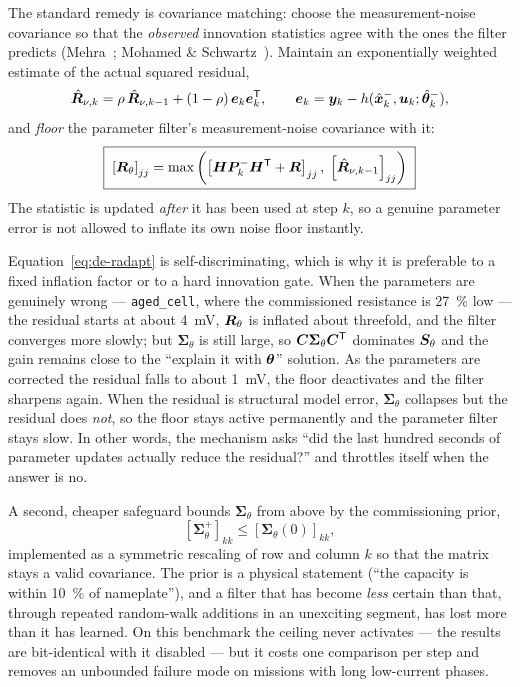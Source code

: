 The standard remedy is covariance matching: choose the measurement-noise covariance so that the
\emph{observed} innovation statistics agree with the ones the filter predicts (Mehra~\cite{mehra1970};
Mohamed \& Schwartz~\cite{mohamed1999adaptive}).  Maintain an exponentially weighted estimate of the
actual squared residual,
\begin{equation}
\hat{\bm{R}}_{\nu,k}=\rho\,\hat{\bm{R}}_{\nu,k-1}+(1-\rho)\,\bm{e}_k\bm{e}_k^{\mathsf{T}},
\qquad \bm{e}_k=\bm{y}_k-h(\hat{\bm{x}}^{-}_k,\bm{u}_k;\hat{\bm{\theta}}^-_k),
\label{eq:de-rhat}
\end{equation}
and \emph{floor} the parameter filter's measurement-noise covariance with it:
\begin{equation}
\boxed{\;\left[\bm{R}_\theta\right]_{jj}=\max\left(\left[\bm{H}\bm{P}^-_k\bm{H}^{\mathsf{T}}+\bm{R}\right]_{jj},\;\left[\hat{\bm{R}}_{\nu,k-1}\right]_{jj}\right)\;}
\label{eq:de-radapt}
\end{equation}
The statistic is updated \emph{after} it has been used at step $k$, so a genuine parameter error is
not allowed to inflate its own noise floor instantly.

Equation~\eqref{eq:de-radapt} is self-discriminating, which is why it is preferable to a fixed
inflation factor or to a hard innovation gate.  When the parameters are genuinely wrong ---
\texttt{aged\_cell}, where the commissioned resistance is \SI{27}{\percent} low --- the residual
starts at about \SI{4}{\milli\volt}, $\bm{R}_\theta$ is inflated about threefold, and the filter
converges more slowly; but $\bm{\Sigma}_\theta$ is still large, so
$\bm{C}\bm{\Sigma}_\theta\bm{C}^{\mathsf{T}}$ dominates $\bm{S}_\theta$ and the gain remains close to the
``explain it with $\bm{\theta}$'' solution.  As the parameters are corrected the residual falls to about
\SI{1}{\milli\volt}, the floor deactivates and the filter sharpens again.  When the residual is
structural model error, $\bm{\Sigma}_\theta$ collapses but the residual does \emph{not}, so the floor
stays active permanently and the parameter filter stays slow.  In other words, the mechanism asks
``did the last hundred seconds of parameter updates actually reduce the residual?'' and throttles
itself when the answer is no.

A second, cheaper safeguard bounds $\bm{\Sigma}_\theta$ from above by the commissioning prior,
\begin{equation}
\left[\bm{\Sigma}^+_\theta\right]_{kk}\le\left[\bm{\Sigma}_\theta(0)\right]_{kk} ,
\label{eq:de-ceiling}
\end{equation}
implemented as a symmetric rescaling of row and column $k$ so that the matrix stays a valid
covariance.  The prior is a physical statement (``the capacity is within \SI{10}{\percent} of
nameplate''), and a filter that has become \emph{less} certain than that, through repeated random-walk
additions in an unexciting segment, has lost more than it has learned.  On this benchmark the ceiling
never activates --- the results are bit-identical with it disabled --- but it costs one comparison per
step and removes an unbounded failure mode on missions with long low-current phases.

